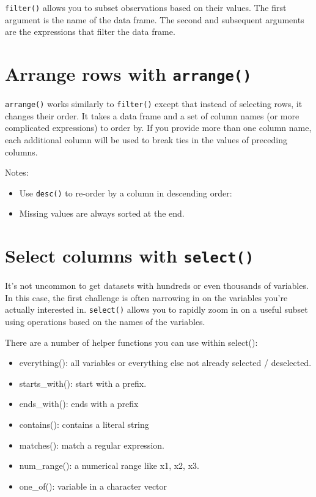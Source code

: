 \documentclass[]{book}
\providecommand{\tightlist}{%
  \setlength{\itemsep}{0pt}\setlength{\parskip}{0pt}}
\begin{document}
\texttt{filter()} allows you to subset observations based on their
values. The first argument is the name of the data frame. The second and
subsequent arguments are the expressions that filter the data frame.

\section{\texorpdfstring{Arrange rows with
\texttt{arrange()}}{Arrange rows with arrange()}}\label{arrange-rows-with-arrange}

\texttt{arrange()} works similarly to \texttt{filter()} except that
instead of selecting rows, it changes their order. It takes a data frame
and a set of column names (or more complicated expressions) to order by.
If you provide more than one column name, each additional column will be
used to break ties in the values of preceding columns.

Notes:

\begin{itemize}
\tightlist
\item
  Use \texttt{desc()} to re-order by a column in descending order:
\item
  Missing values are always sorted at the end.
\end{itemize}

\section{\texorpdfstring{Select columns with
\texttt{select()}}{Select columns with select()}}\label{select-columns-with-select}

It's not uncommon to get datasets with hundreds or even thousands of
variables. In this case, the first challenge is often narrowing in on
the variables you're actually interested in. \texttt{select()} allows
you to rapidly zoom in on a useful subset using operations based on the
names of the variables.

There are a number of helper functions you can use within select():

\begin{itemize}
\tightlist
\item
  everything(): all variables or everything else not already selected /
  deselected.
\item
  starts\_with(): start with a prefix.
\item
  ends\_with(): ends with a prefix
\item
  contains(): contains a literal string
\item
  matches(): match a regular expression.
\item
  num\_range(): a numerical range like x1, x2, x3.
\item
  one\_of(): variable in a character vector
\end{itemize}
\end{document}
